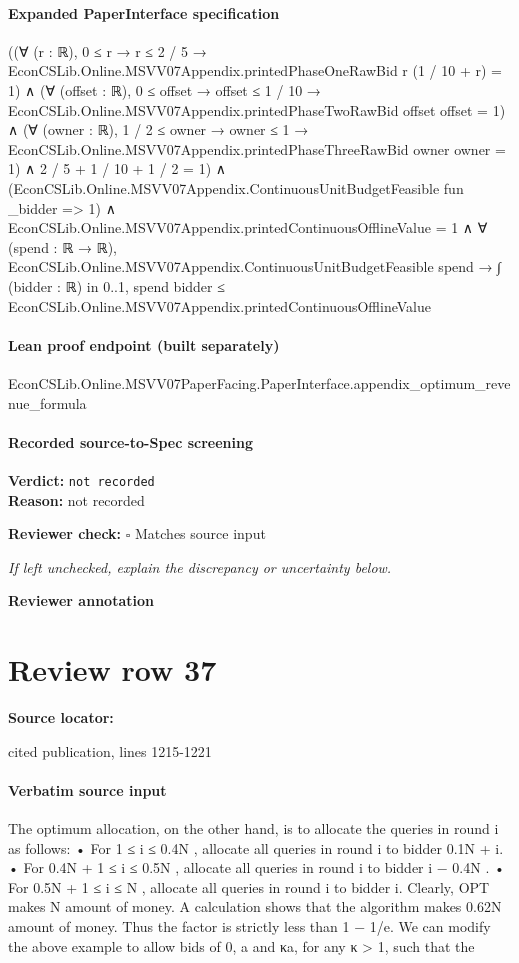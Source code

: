 \documentclass[10pt]{article}
\newcommand{\reviewerbox}{%
  \par\noindent\fbox{\parbox{0.96\linewidth}{\rule{0pt}{0.38in}}}\par
}
\newcommand{\reviewmatch}[1]{%
  \par\noindent\textbf{Reviewer check:} $\square$\; #1\par
  \noindent\emph{If left unchecked, explain the discrepancy or uncertainty below.}\par
}
\begin{document}
\paragraph{Expanded PaperInterface specification}
\begin{ReviewVerbatim}
((∀ (r : ℝ), 0 ≤ r → r ≤ 2 / 5 → EconCSLib.Online.MSVV07Appendix.printedPhaseOneRawBid r (1 / 10 + r) = 1) ∧
    (∀ (offset : ℝ),
        0 ≤ offset → offset ≤ 1 / 10 → EconCSLib.Online.MSVV07Appendix.printedPhaseTwoRawBid offset offset = 1) ∧
      (∀ (owner : ℝ),
          1 / 2 ≤ owner → owner ≤ 1 → EconCSLib.Online.MSVV07Appendix.printedPhaseThreeRawBid owner owner = 1) ∧
        2 / 5 + 1 / 10 + 1 / 2 = 1) ∧
  (EconCSLib.Online.MSVV07Appendix.ContinuousUnitBudgetFeasible fun _bidder => 1) ∧
    EconCSLib.Online.MSVV07Appendix.printedContinuousOfflineValue = 1 ∧
      ∀ (spend : ℝ → ℝ),
        EconCSLib.Online.MSVV07Appendix.ContinuousUnitBudgetFeasible spend →
          ∫ (bidder : ℝ) in 0..1, spend bidder ≤ EconCSLib.Online.MSVV07Appendix.printedContinuousOfflineValue
\end{ReviewVerbatim}

\paragraph{Lean proof endpoint (built separately)}\begin{ReviewVerbatim}
EconCSLib.Online.MSVV07PaperFacing.PaperInterface.appendix_optimum_revenue_formula
\end{ReviewVerbatim}

\paragraph{Recorded source-to-Spec screening}
\textbf{Verdict:} \texttt{not recorded}
\\
\textbf{Reason:} not recorded
\reviewmatch{Matches source input}
\noindent\textbf{Reviewer annotation}\par
\reviewerbox
\clearpage
\hypertarget{source-claim-8d4ba93e593274ac}{}
\section*{Review row 37}
\textbf{Source locator:} {\footnotesize\raggedright cited publication, lines 1215-\allowbreak{}1221\par}
\paragraph{Verbatim source input}
\begin{ReviewVerbatim}
The optimum allocation, on the other hand, is to allocate the queries in round i as follows:
• For 1 ≤ i ≤ 0.4N , allocate all queries in round i to bidder 0.1N + i.
• For 0.4N + 1 ≤ i ≤ 0.5N , allocate all queries in round i to bidder i − 0.4N .
• For 0.5N + 1 ≤ i ≤ N , allocate all queries in round i to bidder i.
Clearly, OPT makes N amount of money. A calculation shows that the algorithm makes 0.62N
amount of money. Thus the factor is strictly less than 1 − 1/e.
We can modify the above example to allow bids of 0, a and κa, for any κ > 1, such that the
\end{ReviewVerbatim}
\end{document}
